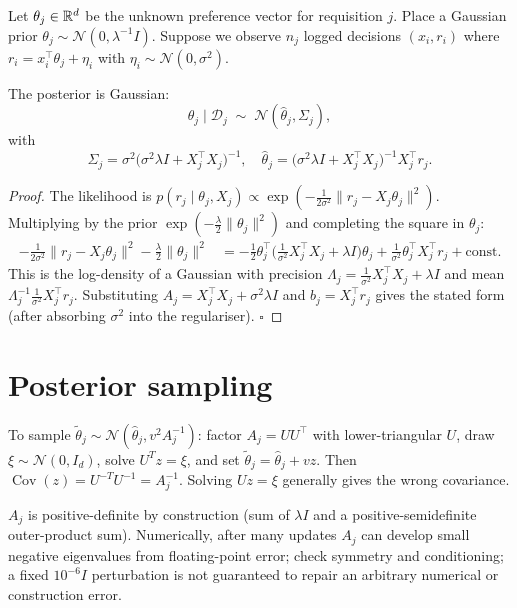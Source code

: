 \documentclass[11pt,oneside]{scrbook}
\begin{document}
Let $\theta_j \in \mathbb{R}^d$ be the unknown preference vector for requisition
$j$. Place a Gaussian prior $\theta_j \sim \mathcal{N}(0, \lambda^{-1} I)$.
Suppose we observe $n_j$ logged decisions $(x_i, r_i)$ where
$r_i = x_i^\top \theta_j + \eta_i$ with $\eta_i \sim \mathcal{N}(0, \sigma^2)$.

\begin{theorem}
The posterior is Gaussian:
\[
\theta_j \mid \mathcal{D}_j \;\sim\; \mathcal{N}(\hat\theta_j, \Sigma_j),
\]
with
\[
\Sigma_j = \sigma^2 \big(\sigma^2 \lambda I + X_j^\top X_j\big)^{-1},
\quad
\hat\theta_j = \big(\sigma^2 \lambda I + X_j^\top X_j\big)^{-1} X_j^\top r_j.
\]
\end{theorem}

\begin{proof}
The likelihood is $p(r_j \mid \theta_j, X_j) \propto \exp(-\tfrac{1}{2\sigma^2} \|r_j - X_j \theta_j\|^2)$.
Multiplying by the prior $\exp(-\tfrac{\lambda}{2}\|\theta_j\|^2)$ and
completing the square in $\theta_j$:
\begin{align*}
-\tfrac{1}{2\sigma^2}\|r_j - X_j\theta_j\|^2 - \tfrac{\lambda}{2}\|\theta_j\|^2
&= -\tfrac{1}{2}\theta_j^\top \Big(\tfrac{1}{\sigma^2}X_j^\top X_j + \lambda I\Big)\theta_j + \tfrac{1}{\sigma^2}\theta_j^\top X_j^\top r_j + \mathrm{const}.
\end{align*}
This is the log-density of a Gaussian with precision $\Lambda_j = \tfrac{1}{\sigma^2}X_j^\top X_j + \lambda I$
and mean $\Lambda_j^{-1} \tfrac{1}{\sigma^2} X_j^\top r_j$. Substituting
$A_j = X_j^\top X_j + \sigma^2 \lambda I$ and $b_j = X_j^\top r_j$ gives the
stated form (after absorbing $\sigma^2$ into the regulariser). $\square$
\end{proof}

\section{Posterior sampling}

To sample $\tilde\theta_j \sim \mathcal{N}(\hat\theta_j, v^2 A_j^{-1})$:
factor $A_j=UU^\top$ with lower-triangular $U$, draw
$\xi\sim\mathcal N(0,I_d)$, solve $U^Tz=\xi$, and set
$\tilde\theta_j=\hat\theta_j+vz$. Then
$\operatorname{Cov}(z)=U^{-T}U^{-1}=A_j^{-1}$. Solving $Uz=\xi$
generally gives the wrong covariance.

\begin{pitfall}
$A_j$ is positive-definite by construction (sum of $\lambda I$ and a
positive-semidefinite outer-product sum). Numerically, after many updates
$A_j$ can develop small negative eigenvalues from floating-point error;
check symmetry and conditioning; a fixed $10^{-6}I$ perturbation
is not guaranteed to repair an arbitrary numerical or construction error.
\end{pitfall}
\end{document}
